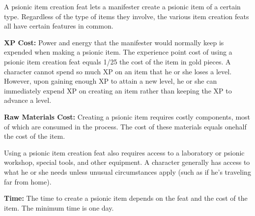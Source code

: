 A psionic item creation feat lets a manifester create a psionic item of a certain type. Regardless of the type of items they involve, the various item creation feats all have certain features in common.

\textbf{XP Cost:} Power and energy that the manifester would normally keep is expended when making a psionic item. The experience point cost of using a psionic item creation feat equals 1/25 the cost of the item in gold pieces. A character cannot spend so much XP on an item that he or she loses a level. However, upon gaining enough XP to attain a new level, he or she can immediately expend XP on creating an item rather than keeping the XP to advance a level.

\textbf{Raw Materials Cost:} Creating a psionic item requires costly components, most of which are consumed in the process. The cost of these materials equals onehalf the cost of the item.

Using a psionic item creation feat also requires access to a laboratory or psionic workshop, special tools, and other equipment. A character generally has access to what he or she needs unless unusual circumstances apply (such as if he's traveling far from home).

\textbf{Time:} The time to create a psionic item depends on the feat and the cost of the item. The minimum time is one day.



